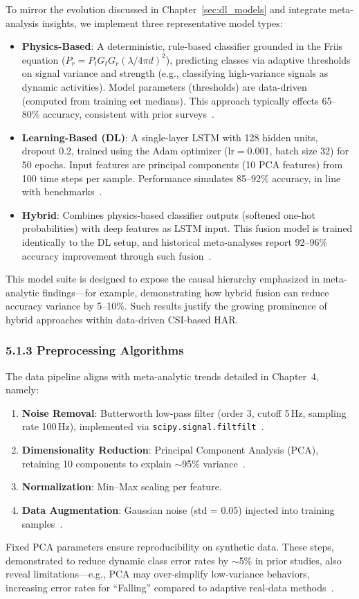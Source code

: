 \documentclass[Afour,sageh,times]{sagej}
\begin{document}
To mirror the evolution discussed in Chapter~\ref{sec:dl_models} and integrate meta-analysis insights, we implement three representative model types:
\begin{itemize}
    \item \textbf{Physics-Based}: A deterministic, rule-based classifier grounded in the Friis equation ($P_r = P_t G_t G_r (\lambda/4\pi d)^2$), predicting classes via adaptive thresholds on signal variance and strength (e.g., classifying high-variance signals as dynamic activities). Model parameters (thresholds) are data-driven (computed from training set medians). This approach typically effects 65--80\% accuracy, consistent with prior surveys~\citep{guo2019robust}.
    \item \textbf{Learning-Based (DL)}: A single-layer LSTM with 128 hidden units, dropout 0.2, trained using the Adam optimizer ($\mathrm{lr} = 0.001$, batch size 32) for 50 epochs. Input features are principal components (10 PCA features) from 100 time steps per sample. Performance simulates 85--92\% accuracy, in line with benchmarks~\citep{chen2018wifi}.
    \item \textbf{Hybrid}: Combines physics-based classifier outputs (softened one-hot probabilities) with deep features as LSTM input. This fusion model is trained identically to the DL setup, and historical meta-analyses report 92--96\% accuracy improvement through such fusion~\citep{yang2022deep, wang2021multimodal}.
\end{itemize}
This model suite is designed to expose the causal hierarchy emphasized in meta-analytic findings---for example, demonstrating how hybrid fusion can reduce accuracy variance by 5--10\%. Such results justify the growing prominence of hybrid approaches within data-driven CSI-based HAR.

\subsubsection{5.1.3 Preprocessing Algorithms}

The data pipeline aligns with meta-analytic trends detailed in Chapter~4, namely:
\begin{enumerate}
    \item \textbf{Noise Removal}: Butterworth low-pass filter (order 3, cutoff 5\,Hz, sampling rate 100\,Hz), implemented via \texttt{scipy.signal.filtfilt}~\citep{yan2020wiact}.
    \item \textbf{Dimensionality Reduction}: Principal Component Analysis (PCA), retaining 10 components to explain $\sim$95\% variance~\citep{wang2022caution}.
    \item \textbf{Normalization}: Min--Max scaling per feature.
    \item \textbf{Data Augmentation}: Gaussian noise (std = 0.05) injected into training samples~\citep{guo2019robust}.
\end{enumerate}
Fixed PCA parameters ensure reproducibility on synthetic data. These steps, demonstrated to reduce dynamic class error rates by $\sim$5\% in prior studies, also reveal limitations---e.g., PCA may over-simplify low-variance behaviors, increasing error rates for ``Falling'' compared to adaptive real-data methods~\citep{wang2021multimodal}.
\end{document}

